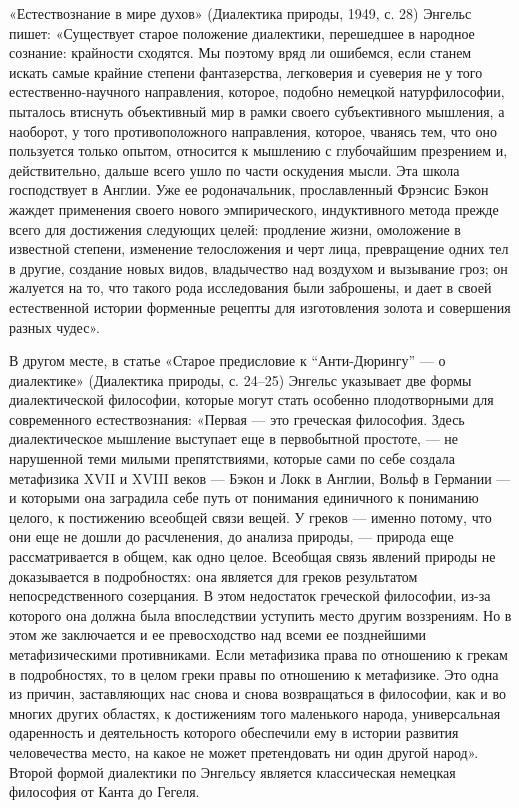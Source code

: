 «Естествознание  в  мире  духов»  (Диалектика природы,  1949,  с.  28)
Энгельс пишет:  «Существует старое положение диалектики,  перешедшее в
народное сознание:  крайности сходятся.  Мы поэтому вряд  ли ошибемся,
если станем  искать самые  крайние степени фантазерства,  легковерия и
суеверия не у того  естественно-научного направления, которое, подобно
немецкой  натурфилософии, пыталось  втиснуть объективный  мир в  рамки
своего  субъективного мышления,  а наоборот,  у того  противоположного
направления, которое,  чванясь тем, что оно  пользуется только опытом,
относится к мышлению с глубочайшим презрением и, действительно, дальше
всего ушло по части оскудения  мысли. Эта школа господствует в Англии.
Уже ее  родоначальник, прославленный  Фрэнсис Бэкон  жаждет применения
своего  нового эмпирического,  индуктивного  метода  прежде всего  для
достижения следующих  целей: продление  жизни, омоложение  в известной
степени, изменение телосложения  и черт лица, превращение  одних тел в
другие,  создание новых  видов, владычество  над воздухом  и вызывание
гроз; он жалуется на то,  что такого рода исследования были заброшены,
и дает в своей естественной истории форменные рецепты для изготовления
золота и совершения разных чудес».

В другом  месте, в статье  «Старое предисловие к  ``Анти-Дюрингу'' ---
о  диалектике»  (Диалектика  природы,  с.  24--25)  Энгельс  указывает
две  формы  диалектической  философии, которые  могут  стать  особенно
плодотворными  для   современного  естествознания:  «Первая   ---  это
греческая  философия. Здесь  диалектическое мышление  выступает еще  в
первобытной  простоте, ---  не нарушенной  теми милыми  препятствиями,
которые сами по себе создала метафизика XVII и XVIII веков --- Бэкон и
Локк  в  Англии,  Вольф  в  Германии  ---  и  которыми  она  заградила
себе путь  от понимания  единичного к  пониманию целого,  к постижению
всеобщей  связи  вещей.  У  греков  --- именно  потому,  что  они  еще
не  дошли  до  расчленения,  до   анализа  природы,  ---  природа  еще
рассматривается  в  общем,  как  одно целое.  Всеобщая  связь  явлений
природы  не  доказывается  в  подробностях: она  является  для  греков
результатом непосредственного созерцания.  В этом недостаток греческой
философии, из-за которого она  должна была впоследствии уступить место
другим воззрениям.  Но в  этом же заключается  и ее  превосходство над
всеми  ее позднейшими  метафизическими  противниками. Если  метафизика
права по отношению к грекам в  подробностях, то в целом греки правы по
отношению к метафизике.  Это одна из причин, заставляющих  нас снова и
снова  возвращаться в  философии,  как и  во  многих других  областях,
к  достижениям того  маленького  народа,  универсальная одаренность  и
деятельность которого  обеспечили ему в истории  развития человечества
место, на  какое не может  претендовать ни один другой  народ». Второй
формой диалектики по Энгельсу является классическая немецкая философия
от Канта до Гегеля.

